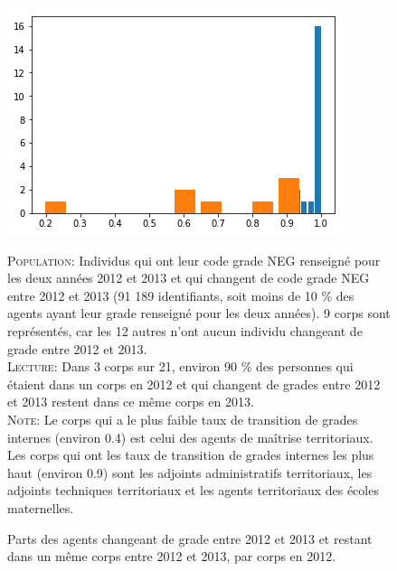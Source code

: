 \documentclass[11pt,a4paper]{article}
\begin{document}
\begin{figure}[H] 
	\caption{Parts des agents changeant de grade entre 2012 et 2013 et restant dans un même corps entre 2012 et 2013, par corps en 2012.}
	\label{transit2} 
	\includegraphics[scale = 0.7]{transitions_intra_corps_only_w_c_neg_change_2012_2013.png} 
	\begin{minipage}{15cm}
		\footnotesize
		\textsc{Population:} Individus qui ont leur code grade NEG renseigné pour les deux années 2012 et 2013 et qui changent de code grade NEG entre 2012 et 2013 (91 189 identifiants, soit moins de 10 \% des agents ayant leur grade renseigné pour les deux années). 9 corps sont représentés, car les 12 autres n'ont aucun individu changeant de grade entre 2012 et 2013.\\
		\textsc{Lecture:} Dans 3 corps sur 21, environ 90 \% des personnes qui étaient dans un corps en 2012 et qui changent de grades entre 2012 et 2013 restent dans ce même corps en 2013. \\
		\textsc{Note:} Le corps qui a le plus faible taux de transition de grades internes (environ 0.4) est celui des agents de maîtrise territoriaux. Les corps qui ont les taux de transition de grades internes les plus haut (environ 0.9) sont les adjoints administratifs territoriaux, les adjoints techniques territoriaux et les agents territoriaux des écoles maternelles.
	\end{minipage}
\end{figure}
\end{document}
